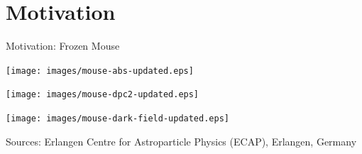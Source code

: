 

\usepackage{wrapfig}



\subtitle{Phase Contrast X-ray}



\frame[plain,c]{\titlepage} %




\section{Motivation}%
\label{sec:motivation}



\begin{frame}{Motivation: Frozen Mouse}
    \begin{center}\texttt{[image: images/mouse-abs-updated.eps]}\end{center}
    \begin{center}\texttt{[image: images/mouse-dpc2-updated.eps]}\end{center}
    \begin{center}\texttt{[image: images/mouse-dark-field-updated.eps]}\end{center}


    \begin{flushright}
        \tiny Sources: Erlangen Centre for Astroparticle Physics (ECAP), Erlangen, Germany
    \end{flushright}
\end{frame}


